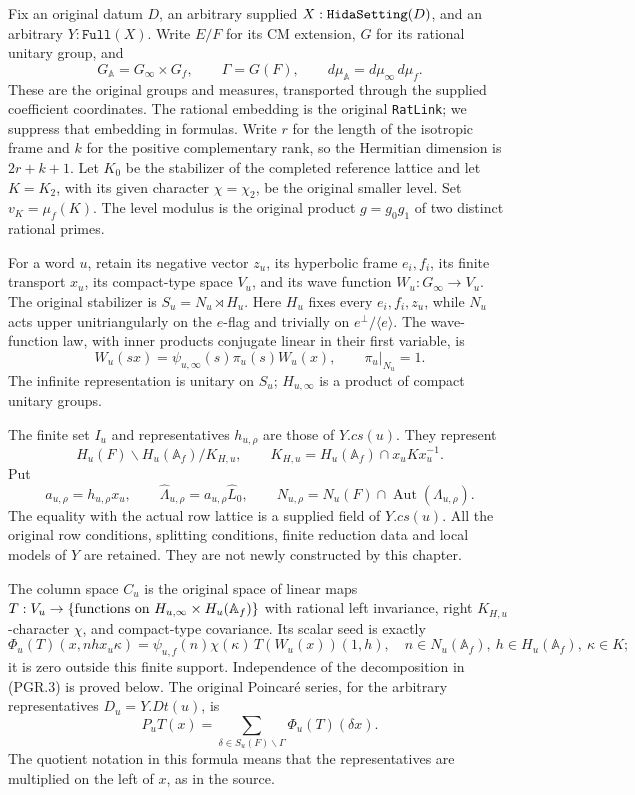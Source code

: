 \documentclass[11pt,a4paper]{article}
\numberwithin{equation}{section}
\theoremstyle{remark}\newtheorem{remark}[theorem]{Remark}
\begin{document}
Fix an original datum \(D\), an arbitrary supplied
\(X:\texttt{Hida\allowbreak Setting}(D)\), and an arbitrary
\(Y:\texttt{Full}(X)\).  Write \(E/F\) for its CM extension,
\(G\) for its rational unitary group, and
\[
 G_{\mathbb A}=G_\infty\times G_f,\qquad
 \Gamma=G(F),\qquad d\mu_{\mathbb A}=d\mu_\infty\,d\mu_f.
\]
These are the original groups and measures, transported through the
supplied coefficient coordinates.  The rational embedding is the
original \texttt{Rat\allowbreak Link}; we suppress that embedding in formulas.
Write \(r\) for the length of the isotropic frame and \(k\) for the
positive complementary rank, so the Hermitian dimension is \(2r+k+1\).
Let \(K_0\) be the stabilizer of the completed reference lattice and
let \(K=K_2\), with its given character \(\chi=\chi_2\), be the
original smaller level.  Set \(v_K=\mu_f(K)\).  The level modulus is
the original product \(g=g_0g_1\) of two distinct rational primes.

For a word \(u\), retain its negative vector \(z_u\), its
hyperbolic frame \(e_i,f_i\), its finite transport \(x_u\), its
compact-type space \(V_u\), and its wave function
\(W_u:G_\infty\to V_u\).  The original stabilizer is
\(S_u=N_u\rtimes H_u\).  Here \(H_u\) fixes every
\(e_i,f_i,z_u\), while \(N_u\) acts upper unitriangularly on the
\(e\)-flag and trivially on \(e^\perp/\langle e\rangle\).
The wave-function law, with inner products conjugate linear in their
first variable, is
\[
 W_u(sx)=\psi_{u,\infty}(s)\pi_u(s)W_u(x),
 \qquad \pi_u|_{N_u}=1.
\tag{PGR.1}
\]
The infinite representation is unitary on \(S_u\); \(H_{u,\infty}\)
is a product of compact unitary groups.

The finite set \(I_u\) and representatives \(h_{u,\rho}\) are
those of \(Y.cs(u)\).  They represent
\[
 H_u(F)\backslash H_u(\mathbb A_f)/K_{H,u},\qquad
 K_{H,u}=H_u(\mathbb A_f)\cap x_uKx_u^{-1}.
\]
Put
\[
 a_{u,\rho}=h_{u,\rho}x_u,\qquad
 \widehat\Lambda_{u,\rho}=a_{u,\rho}\widehat L_0,
 \qquad N_{u,\rho}=N_u(F)\cap\operatorname{Aut}(\Lambda_{u,\rho}).
\tag{PGR.2}
\]
The equality with the actual row lattice is a supplied field of
\(Y.cs(u)\).  All the original row conditions, splitting conditions,
finite reduction data and local models of \(Y\) are retained.
They are not newly constructed by this chapter.

The column space \(C_u\) is the original space of linear maps
\(T:V_u\to\{\hbox{functions on }H_{u,\infty}\times H_u(\mathbb A_f)\}\)
with rational left invariance, right \(K_{H,u}\)-character \(\chi\),
and compact-type covariance.  Its scalar seed is exactly
\[
 \Phi_u(T)(x,n h x_u\kappa)
   =\psi_{u,f}(n)\chi(\kappa)\,T(W_u(x))(1,h),
 \quad n\in N_u(\mathbb A_f),\ h\in H_u(\mathbb A_f),\ \kappa\in K;
\tag{PGR.3}
\]
it is zero outside this finite support.  Independence of the
decomposition in (PGR.3) is proved below.  The original Poincar\'e
series, for the arbitrary representatives \(D_u=Y.Dt(u)\), is
\[
 P_uT(x)=\sum_{\delta\in S_u(F)\backslash\Gamma}
                         \Phi_u(T)(\delta x).
\tag{PGR.4}
\]
The quotient notation in this formula means that the representatives
are multiplied on the left of \(x\), as in the source.
\end{document}
